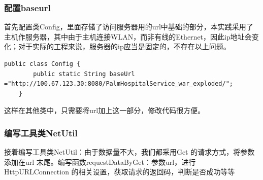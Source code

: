 \documentclass[UTF8,12pt]{article}
\begin{document}
\subsubsection{配置baseurl}
首先配置类Config，里面存储了访问服务器用的url中基础的部分，本实践采用了主机作服务器，其中由于主机连接WLAN，而非有线的Ethernet，因此ip地址会变化；对于实际的工程来说，服务器的ip应当是固定的，不存在以上问题。

\begin{lstlisting}[frame=shadowbox]
    public class Config {
        public static String baseUrl ="http://100.67.123.30:8080/PalmHospitalService_war_exploded/";
    }
\end{lstlisting}

这样在其他类中，只需要将url加上这一部分，修改代码很方便。

\subsubsection{编写工具类NetUtil}
接着编写工具类NetUtil：由于数据量不大，我们都采用Get 的请求方式，将参数添加在url 末尾。编写函数requestDataByGet：参数url，进行HttpURLConnection 的相关设置，获取请求的返回码，判断是否成功等等
\end{document}
